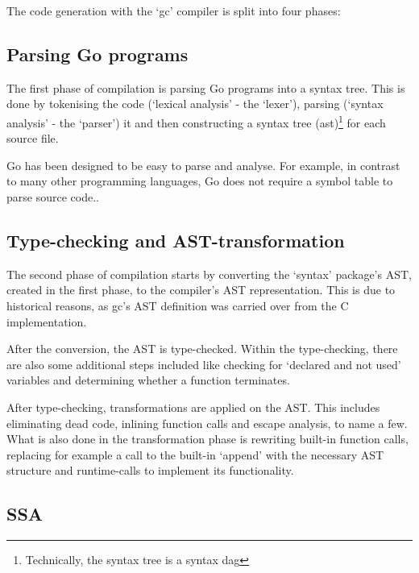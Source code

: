 The code generation with the `gc' compiler is split into four phases:

\subsection{Parsing Go programs}


The first phase of compilation is parsing Go programs into a syntax tree. This
is done by tokenising the code (`lexical analysis' - the `lexer'), parsing
(`syntax analysis' - the `parser') it and then constructing a syntax tree
(\gls{ast})\footnote{Technically, the syntax tree is a syntax \gls{dag}\autocite{ast-node-dag}}
for each source file.

Go has been designed to be easy to parse and analyse. For example, in contrast
to many other programming languages,
Go does not require a symbol table to parse source code.\autocite{go-faq-symbol}.

\subsection{Type-checking and AST-transformation}\label{sec:comp-type}

The second phase of compilation starts by converting the `syntax' package's
AST, created in the first phase, to the compiler's AST representation. This
is due to historical reasons, as gc's AST definition was carried over
from the C implementation.

After the conversion, the AST is type-checked. Within the type-checking, there
are also some additional steps included like checking for `declared and not used'
variables and determining whether a function terminates.

After type-checking, transformations are applied on the AST. This includes
eliminating dead code, inlining function calls and escape analysis, to name a few.
What is also done in the transformation phase is rewriting built-in function
calls, replacing for example a call to the built-in `append' with the necessary
AST structure and runtime-calls to implement its functionality.

\subsection{SSA}

